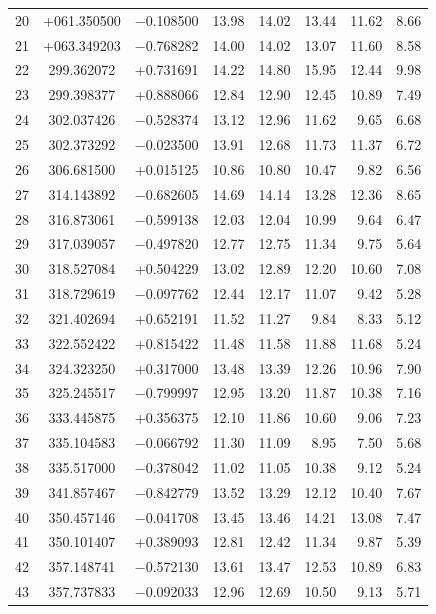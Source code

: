 \documentclass[times,usenatbib]{mn2e}
\begin{document}
\begin{table}
\begin{center}
\begin{tabular}{lccrrrrr}
20 & +061.350500 & $-$0.108500 & 13.98 & 14.02 & 13.44 & 11.62 & 8.66 \\
21 & +063.349203 & $-$0.768282 & 14.00 & 14.02 & 13.07 & 11.60 & 8.58 \\
22 & 299.362072 & +0.731691 & 14.22 & 14.80 & 15.95 & 12.44 & 9.98 \\
23 & 299.398377 & +0.888066 & 12.84 & 12.90 & 12.45 & 10.89 & 7.49 \\
24 & 302.037426 & $-$0.528374 & 13.12 & 12.96 & 11.62 & 9.65 & 6.68 \\
25 & 302.373292 & $-$0.023500 & 13.91 & 12.68 & 11.73 & 11.37 & 6.72 \\
26 & 306.681500 & +0.015125 & 10.86 & 10.80 & 10.47 & 9.82 & 6.56 \\
27 & 314.143892 & $-$0.682605 & 14.69 & 14.14 & 13.28 & 12.36 & 8.65 \\
28 & 316.873061 & $-$0.599138 & 12.03 & 12.04 & 10.99 & 9.64 & 6.47 \\
29 & 317.039057 & $-$0.497820 & 12.77 & 12.75 & 11.34 & 9.75 & 5.64 \\
30 & 318.527084 & +0.504229 & 13.02 & 12.89 & 12.20 & 10.60 & 7.08 \\
31 & 318.729619 & $-$0.097762 & 12.44 & 12.17 & 11.07 & 9.42 & 5.28 \\
32 & 321.402694 & +0.652191 & 11.52 & 11.27 & 9.84 & 8.33 & 5.12 \\
33 & 322.552422 & +0.815422 & 11.48 & 11.58 & 11.88 & 11.68 & 5.24 \\
34 & 324.323250 & +0.317000 & 13.48 & 13.39 & 12.26 & 10.96 & 7.90 \\
35 & 325.245517 & $-$0.799997 & 12.95 & 13.20 & 11.87 & 10.38 & 7.16 \\
36 & 333.445875 & +0.356375 & 12.10 & 11.86 & 10.60 & 9.06 & 7.23 \\
37 & 335.104583 & $-$0.066792 & 11.30 & 11.09 & 8.95 & 7.50 & 5.68 \\
38 & 335.517000 & $-$0.378042 & 11.02 & 11.05 & 10.38 & 9.12 & 5.24 \\
39 & 341.857467 & $-$0.842779 & 13.52 & 13.29 & 12.12 & 10.40 & 7.67 \\
40 & 350.457146 & $-$0.041708 & 13.45 & 13.46 & 14.21 & 13.08 & 7.47 \\
41 & 350.101407 & +0.389093 & 12.81 & 12.42 & 11.34 & 9.87 & 5.39 \\
42 & 357.148741 & $-$0.572130 & 13.61 & 13.47 & 12.53 & 10.89 & 6.83 \\
43 & 357.737833 & $-$0.092033 & 12.96 & 12.69 & 10.50 & 9.13 & 5.71 \\
\hline
\end{tabular}
\end{center}
\label{candidate-catalogue}
\end{table}
\end{document}
